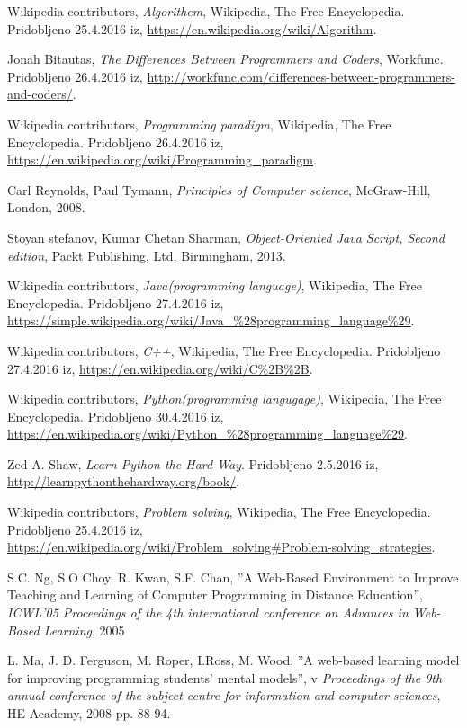 \begin{thebibliography}{100}
 Wikipedia contributors, \emph{Algorithem},
  Wikipedia, The Free Encyclopedia. Pridobljeno 25.4.2016 iz,
  \url{https://en.wikipedia.org/wiki/Algorithm}.

 Jonah Bitautas, \emph{The Differences Between
    Programmers and Coders}, Workfunc. Pridobljeno 26.4.2016 iz,
  \url{http://workfunc.com/differences-between-programmers-and-coders/}.

 Wikipedia contributors, \emph{Programming paradigm}, Wikipedia, The Free Encyclopedia. Pridobljeno
  26.4.2016 iz,
  \url{https://en.wikipedia.org/wiki/Programming_paradigm}.

 Carl Reynolds, Paul Tymann, \emph{Principles of Computer science},
  McGraw-Hill, London, 2008.

 Stoyan stefanov, Kumar Chetan Sharman, \emph{Object-Oriented Java Script,
    Second edition}, Packt Publishing, Ltd, Birmingham, 2013.

 Wikipedia contributors, \emph{Java(programming
    language)}, Wikipedia, The Free Encyclopedia. Pridobljeno
  27.4.2016 iz,
  \url{https://simple.wikipedia.org/wiki/Java_%28programming_language%29}.

 Wikipedia contributors, \emph{C++}, Wikipedia, The
  Free Encyclopedia. Pridobljeno 27.4.2016 iz,
  \url{https://en.wikipedia.org/wiki/C%2B%2B}.

 Wikipedia contributors, \emph{Python(programming
    langugage)}, Wikipedia, The
  Free Encyclopedia. Pridobljeno 30.4.2016 iz,
  \url{https://en.wikipedia.org/wiki/Python_%28programming_language%29}.

 Zed A. Shaw, \emph{Learn Python the Hard Way}. Pridobljeno 2.5.2016
  iz, \url{http://learnpythonthehardway.org/book/}.

 Wikipedia contributors, \emph{Problem
    solving}, Wikipedia, The Free Encyclopedia. Pridobljeno 25.4.2016
  iz,
  \url{https://en.wikipedia.org/wiki/Problem_solving#Problem-solving_strategies}.

 S.C. Ng, S.O Choy, R. Kwan, S.F. Chan,
  ''A Web-Based Environment to Improve Teaching and Learning of
  Computer Programming in Distance Education'', \emph{ICWL'05
    Proceedings of the 4th international conference on Advances in
    Web-Based Learning}, 2005

 L. Ma, J. D. Ferguson, M. Roper, I.Ross, M. Wood,
  ''A web-based learning model for improving programming students' mental
  models'', v \emph{Proceedings of the 9th annual conference of the subject
  centre for information and computer sciences}, HE Academy, 2008
  pp. 88-94.


\end{thebibliography}
